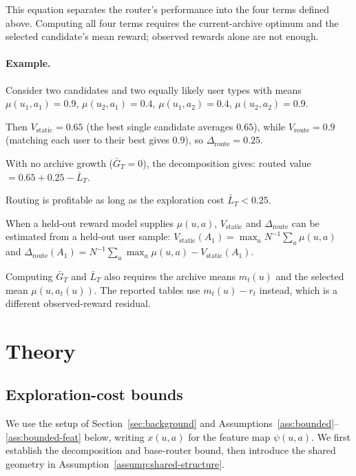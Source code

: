 \documentclass{article} %
\begin{document}
This equation separates the router's performance into the four terms defined
above. Computing all four terms requires the current-archive optimum and the
selected candidate's mean reward; observed rewards alone are not enough.

\paragraph{Example.} Consider two candidates and two equally likely user types with means $\mu(u_1,a_1)=0.9$, $\mu(u_2,a_1)=0.4$, $\mu(u_1,a_2)=0.4$, $\mu(u_2,a_2)=0.9$.

Then $V_{\mathrm{static}}=0.65$ (the best single candidate averages $0.65$), while $V_{\mathrm{route}}=0.9$ (matching each user to their best gives $0.9$), so $\Delta_{\mathrm{route}}=0.25$.

With no archive growth ($\bar G_T=0$), the decomposition gives: routed value $= 0.65 + 0.25 - \bar L_T$.

Routing is profitable as long as the exploration cost $\bar L_T < 0.25$.

When a held-out reward model supplies \(\mu(u,a)\),
\(V_{\mathrm{static}}\) and \(\Delta_{\mathrm{route}}\) can be estimated from a
held-out user sample:
\(V_{\mathrm{static}}(A_1)=\max_a N^{-1}\sum_u\mu(u,a)\) and
\(\Delta_{\mathrm{route}}(A_1)
=N^{-1}\sum_u\max_a\mu(u,a)-V_{\mathrm{static}}(A_1)\).

Computing \(\bar G_T\) and \(\bar L_T\) also requires the archive means
\(m_t(u)\) and the selected mean \(\mu(u,a_t(u))\). The reported tables use
\(m_t(u)-r_t\) instead, which is a different observed-reward residual.

\section{Theory}
\label{sec:hyper-theory}
\label{sec:theory}



\subsection{Exploration-cost bounds}

\label{sec:method-assump}

We use the setup of Section~\ref{sec:background} and Assumptions~\ref{ass:bounded}--\ref{ass:bounded-feat} below, writing $x(u,a)$ for the feature map $\psi(u,a)$. We first establish the decomposition and base-router bound, then introduce the shared geometry in Assumption~\ref{assump:shared-structure}.
\end{document}
